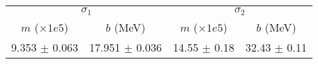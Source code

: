 \begin{tabular}{cc|cc}
\multicolumn{2}{c|}{$\sigma_1$} & \multicolumn{2}{|c}{$\sigma_2$} \\
$m$ ($\times1e5$) & $b$ (MeV) & $m$ ($\times1e5$) & $b$ (MeV) \\
\hline
9.353 $\pm$ 0.063 & 17.951 $\pm$ 0.036 & 14.55 $\pm$ 0.18 & 32.43 $\pm$ 0.11\\
\end{tabular}
